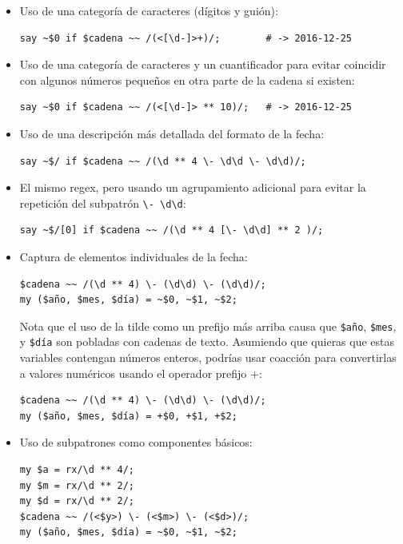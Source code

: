 \begin{itemize}

\item Uso de una categoría de caracteres (dígitos y guión):

\begin{verbatim}
say ~$0 if $cadena ~~ /(<[\d-]>+)/;        # -> 2016-12-25
\end{verbatim}
%

\item Uso de una categoría de caracteres y un cuantificador
para evitar coincidir con algunos números pequeños 
en otra parte de la cadena si existen:

\begin{verbatim}
say ~$0 if $cadena ~~ /(<[\d-]> ** 10)/;   # -> 2016-12-25
\end{verbatim}
%

\item Uso de una descripción más detallada del formato de la fecha:
\begin{verbatim}
say ~$/ if $cadena ~~ /(\d ** 4 \- \d\d \- \d\d)/;
\end{verbatim}
%

\item El mismo regex, pero usando un agrupamiento adicional 
para evitar la repetición del subpatrón \verb|\- \d\d|:

\begin{verbatim}
say ~$/[0] if $cadena ~~ /(\d ** 4 [\- \d\d] ** 2 )/; 
\end{verbatim}
%

\item Captura de elementos individuales de la fecha:
\begin{verbatim}
$cadena ~~ /(\d ** 4) \- (\d\d) \- (\d\d)/;
my ($año, $mes, $día) = ~$0, ~$1, ~$2;
\end{verbatim}
%
Nota que el uso de la tilde como un prefijo más arriba
causa que \verb|$año|, \verb|$mes|, y \verb|$día| son
pobladas con cadenas de texto. Asumiendo que quieras
que estas variables contengan números enteros, podrías 
usar coacción para convertirlas a valores numéricos usando el operador
prefijo +:
\begin{verbatim}
$cadena ~~ /(\d ** 4) \- (\d\d) \- (\d\d)/;
my ($año, $mes, $día) = +$0, +$1, +$2;
\end{verbatim}
%
 

\item Uso de subpatrones como componentes básicos:
\begin{verbatim}
my $a = rx/\d ** 4/;
my $m = rx/\d ** 2/;
my $d = rx/\d ** 2/;
$cadena ~~ /(<$y>) \- (<$m>) \- (<$d>)/;
my ($año, $mes, $día) = ~$0, ~$1, ~$2;
\end{verbatim}
%


\end{itemize}
